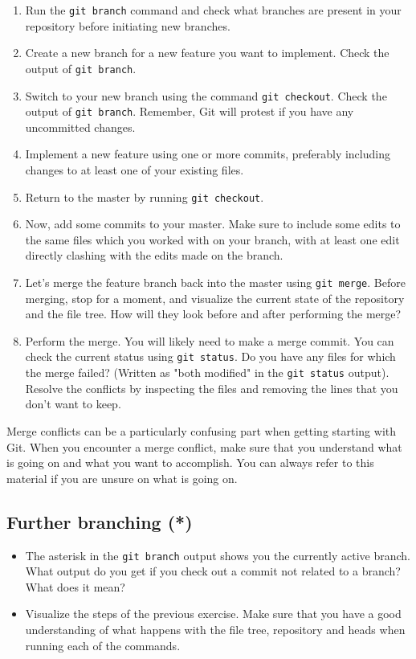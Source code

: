 \documentclass[../main/git_course_main.tex]{subfiles}
\begin{document}
\begin{enumerate}
	\item Run the \verb$git branch$ command and check what branches are present in your repository before initiating new branches.
	\item Create a new branch for a new feature you want to implement. Check the output of \verb$git branch$.
	\item Switch to your new branch using the command \verb$git checkout$. Check the output of \verb$git branch$. Remember, Git will protest if you have any uncommitted changes.
	\item Implement a new feature using one or more commits, preferably including changes to at least one of your existing files.
	\item Return to the master by running \verb$git checkout$.
	\item Now, add some commits to your master. Make sure to include some edits to the same files which you worked with on your branch, with at least one edit directly clashing with the edits made on the branch.
	\item Let's merge the feature branch back into the master using \verb$git merge$. Before merging, stop for a moment, and visualize the current state of the repository and the file tree. How will they look before and after performing the merge?
	\item Perform the merge. You will likely need to make a merge commit. You can check the current status using \verb$git status$. Do you have any files for which the merge failed? (Written as "both modified" in the \verb$git status$ output). Resolve the conflicts by inspecting the files and removing the lines that you don't want to keep.	
\end{enumerate}

Merge conflicts can be a particularly confusing part when getting starting with Git. When you encounter a merge conflict, make sure that you understand what is going on and what you want to accomplish. You can always refer to this material if you are unsure on what is going on.

\subsection{Further branching (*)}

\begin{itemize}
	\item The asterisk in the \verb$git branch$ output shows you the currently active branch. What output do you get if you check out a commit not related to a branch? What does it mean?
	\item Visualize the steps of the previous exercise. Make sure that you have a good understanding of what happens with the file tree, repository and heads when running each of the commands.
\end{itemize}
\end{document}
